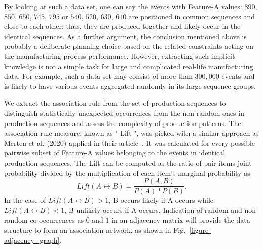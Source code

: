 By looking at such a data set, one can say the events with Feature-A values: $890$, $850$, $650$, $745$, $795$ or $540$, $520$, $630$, $610$ are positioned in common sequences and close to each other; thus, they are produced together and likely occur in the identical sequences. As a further argument, the conclusion mentioned above is probably a deliberate planning choice based on the related constraints acting on the manufacturing process performance. However, extracting such implicit knowledge is not a simple task for large and complicated real-life manufacturing data. For example, such a data set may consist of more than $300,000$ events and is likely to have various events aggregated randomly in its large sequence groups.

We extract the association rule from the set of production sequences to distinguish statistically unexpected occurrences from the non-random ones in production sequences and assess the complexity of production patterns. The association rule measure, known as " Lift ", was picked with a similar approach as Merten et al. (2020) applied in their article~\cite{MERTEN2020}. It was calculated for every possible pairwise subset of Feature-A values belonging to the events in identical production sequences. The Lift can be computed as the ratio of pair items joint probability divided by the multiplication of each item's marginal probability as
\begin{equation} %
	Lift(A\leftrightarrow B)=\frac{P(A,B)}{P(A)*P(B)}.
	\label{lift}
\end{equation}
In the case of $Lift(A\leftrightarrow B)> 1$, B occurs likely if A occurs while $Lift(A\leftrightarrow B)< 1$, B unlikely occurs if A occurs. Indication of random and non-random co-occurrences as $0$ and $1$ in an adjacency matrix will provide the data structure to form an association network, as shown in Fig.~\ref{figure-adjacency_graph}.

